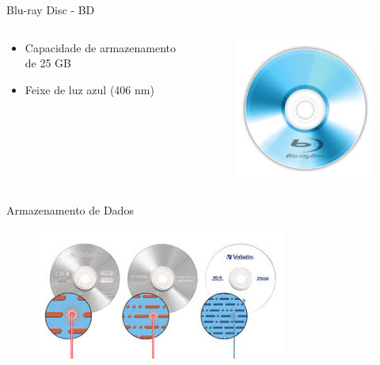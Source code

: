 \documentclass[aspectratio=169,
				xcolor=table]{beamer}
\begin{document}
	\begin{frame}{Blu-ray Disc - BD}		
		\begin{columns}
			\begin{column}{0.6\textwidth}
				\begin{itemize}
					\item Capacidade de armazenamento de 25 GB
					\vspace{1em}
					\item Feixe de luz azul (406 nm)
				\end{itemize}
			\end{column}
			\begin{column}{0.4\textwidth}
		\begin{figure}[hbtp]
			\centering
			\includegraphics[width=\textwidth, keepaspectratio]{../figs/cap08/bluray}
		\end{figure}
			\end{column}
		\end{columns}

		
	\end{frame}

	\begin{frame}{Armazenamento de Dados}
		\begin{figure}[hbtp]
			\centering
			\includegraphics[height=0.75\textheight, keepaspectratio]{../figs/cap08/otico4}
		\end{figure}
	\end{frame}
	
\end{document}
